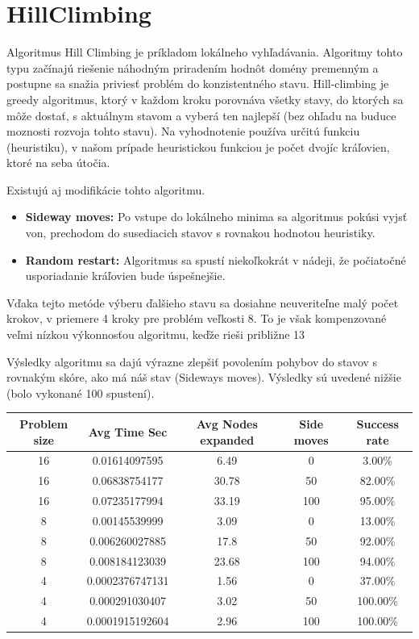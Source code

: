 \section*{HillClimbing}

Algoritmus Hill Climbing je príkladom lokálneho vyhľadávania. Algoritmy tohto typu začínajú riešenie náhodným priradením hodnôt domény premenným a postupne sa snažia priviesť problém do konzistentného stavu.
Hill-climbing je greedy algoritmus, ktorý v každom kroku porovnáva všetky stavy, do ktorých sa môže dostať, s aktuálnym stavom a vyberá ten najlepší (bez ohľadu na buduce moznosti rozvoja tohto stavu). Na vyhodnotenie používa určitú funkciu (heuristiku), v našom prípade heuristickou funkciou je počet dvojíc kráľovien, ktoré na seba útočia.

Existujú aj modifikácie tohto algoritmu.

\begin{itemize}
    \item \textbf{Sideway moves:} Po vstupe do lokálneho minima sa algoritmus pokúsi vyjsť von, prechodom do susediacich stavov s rovnakou hodnotou heuristiky.
    \item \textbf{Random restart:} Algoritmus sa spustí niekoľkokrát v nádeji, že počiatočné usporiadanie kráľovien bude úspešnejšie.
\end{itemize}


Vďaka tejto metóde výberu ďalšieho stavu sa dosiahne neuveriteľne malý počet krokov, v priemere 4 kroky pre problém veľkosti 8. To je však kompenzované veľmi nízkou výkonnosťou algoritmu, keďže rieši približne 13 %

Výsledky algoritmu sa dajú výrazne zlepšiť povolením pohybov do stavov s rovnakým skóre, ako má náš stav (Sideways moves).
Výsledky sú uvedené nižšie (bolo vykonané 100 spustení).
\begin{longtable}{|c|c|c|c|c|}
  \hline
  \textbf{Problem size} & \textbf{Avg Time Sec} & \textbf{Avg Nodes expanded} & \textbf{Side moves} & \textbf{Success rate} \\
  \hline
  16 & 0.01614097595 & 6.49 & 0 & 3.00\% \\
  16 & 0.06838754177 & 30.78 & 50 & 82.00\% \\
  16 & 0.07235177994 & 33.19 & 100 & 95.00\% \\
  \hline
  8  & 0.00145539999  & 3.09  & 0 & 13.00\% \\
  8  & 0.006260027885 & 17.8  & 50 & 92.00\% \\
  8  & 0.008184123039 & 23.68 & 100 & 94.00\% \\
  \hline
  4  & 0.0002376747131 & 1.56  & 0 & 37.00\% \\
  4  & 0.000291030407  & 3.02  & 50 & 100.00\% \\
  4  & 0.0001915192604 & 2.96  & 100 & 100.00\% \\
  \hline
\end{longtable}
